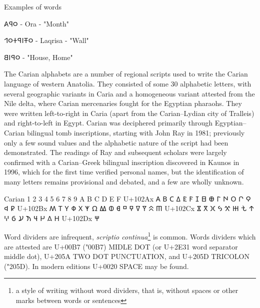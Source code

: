 \begin{description}
Examples of words

𐤬𐤭𐤠  - Ora - "Month"

𐤬𐤳𐤦𐤭𐤲𐤬𐤩  - Laqrisa - "Wall"

𐤬𐤭𐤦𐤡  - "House, Home"

\egroup

\item [Carian] The Carian alphabets are a number of regional scripts used to write the Carian language of western Anatolia. They consisted of some 30 alphabetic letters, with several geographic variants in Caria and a homogeneous variant attested from the Nile delta, where Carian mercenaries fought for the Egyptian pharaohs. They were written left-to-right in Caria (apart from the Carian–Lydian city of Tralleis) and right-to-left in Egypt. Carian was deciphered primarily through Egyptian–Carian bilingual tomb inscriptions, starting with John Ray in 1981; previously only a few sound values and the alphabetic nature of the script had been demonstrated. The readings of Ray and subsequent scholars were largely confirmed with a Carian–Greek bilingual inscription discovered in Kaunos in 1996, which for the first time verified personal names, but the identification of many letters remains provisional and debated, and a few are wholly unknown.

\begin{scriptexample}[]{Carian}
\bgroup
\carian
{}	1	2	3	4	5	6	7	8	9	A	B	C	D	E	F
U+102Ax	𐊠	𐊡	𐊢	𐊣	𐊤	𐊥	𐊦	𐊧	𐊨	𐊩	𐊪	𐊫	𐊬	𐊭	𐊮	𐊯
U+102Bx	𐊰	𐊱	𐊲	𐊳	𐊴	𐊵	𐊶	𐊷	𐊸	𐊹	𐊺	𐊻	𐊼	𐊽	𐊾	𐊿
U+102Cx	𐋀	𐋁	𐋂	𐋃	𐋄	𐋅	𐋆	𐋇	𐋈	𐋉	𐋊	𐋋	𐋌	𐋍	𐋎	𐋏
U+102Dx	𐋐
\egroup
\end{scriptexample}

\newfontfamily{}

Word dividers are infrequent, \emph{scriptio continua}\footnote{a style of writing without word dividers, that is, without spaces or other marks between words or sentences} is common. Words dividers which are attested are U+00B7 (\char"00B7) \textsc{MIDLE DOT} (or U+2E31 word separator middle dot), U+205A TWO DOT PUNCTUATION, and U+205D TRICOLON ({\oldpunctuation\char"205D}). In modern editions U+0020 SPACE may be found.

\end{description}